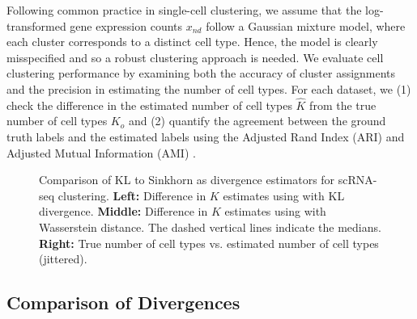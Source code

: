 Following common practice in single-cell clustering,  we assume that the log-transformed gene expression counts $x_{nd}$
follow a Gaussian mixture model, where each cluster corresponds to a distinct cell type.
Hence, the model is clearly misspecified and so a robust clustering approach is needed.
We evaluate cell clustering performance by examining both the accuracy of cluster assignments and the precision in estimating the number of cell types.
For each dataset, we (1) check the difference in the estimated number of cell types $\widehat K$ from the true
number of cell types $K_o$ and (2) quantify the agreement between the ground truth labels and the estimated labels using the Adjusted Rand Index (ARI) and Adjusted Mutual Information (AMI) \citep{ari,ami}.

\begin{figure}[h!]
	\centering

	\caption{Comparison of KL to Sinkhorn as divergence estimators for scRNA-seq clustering. \textbf{Left:} Difference in $K$ estimates using \methodname with KL divergence.
		\textbf{Middle:} Difference in $K$ estimates using \methodname with Wasserstein distance.
		The dashed vertical lines indicate the medians.
		\textbf{Right:} True number of cell types vs. estimated number of cell types (jittered).
	}
	\label{fig:sh_kl_comp}
\end{figure}

\subsection{Comparison of Divergences}

